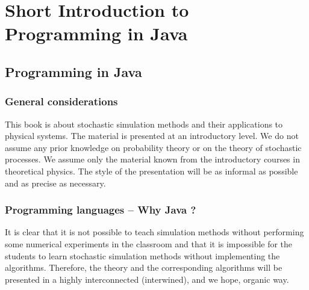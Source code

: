 \chapter{Short Introduction to Programming in Java}

\section{Programming in Java}
\label{sec:Programming}


\subsection{General considerations}
\label{sec:General_considerations}
This book is about stochastic simulation methods and their applications to
physical systems. The material is presented at an introductory level. We do 
not assume any prior knowledge on probability theory or on the theory of 
stochastic processes. We assume only the material known from the introductory 
courses in theoretical physics. The style of the presentation will be as 
informal as possible and as precise as necessary.



\subsection{Programming languages -- Why Java ?}
\label{sec:Programming_languages}
It is clear that it is not possible to teach simulation methods without 
performing some numerical experiments in the classroom and that it is 
impossible for the students to learn stochastic simulation methods without 
implementing the algorithms. Therefore, the theory and the corresponding 
algorithms will be presented in a highly interconnected (interwined), and we 
hope, organic way.

